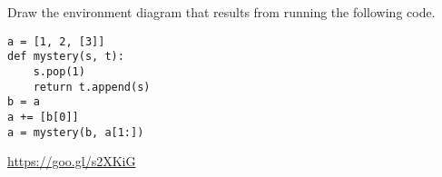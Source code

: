 \begin{blocksection}
\question Draw the environment diagram that results from running the following code.

\begin{lstlisting}
a = [1, 2, [3]]
def mystery(s, t):
    s.pop(1)
    return t.append(s)
b = a
a += [b[0]]
a = mystery(b, a[1:])
\end{lstlisting}

\begin{solution}[1in]
\url{https://goo.gl/s2XKiG}
\end{solution}
\end{blocksection}
